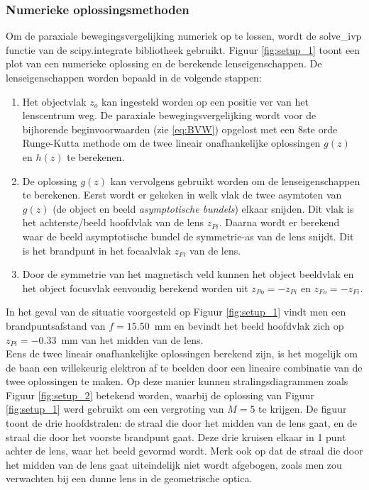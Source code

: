 \documentclass[we,twoside,openright,a4paper,11pt]{uantwerpenbamathesis}
\begin{document}
\subsubsection{Numerieke oplossingsmethoden}
Om de paraxiale bewegingsvergelijking numeriek op te lossen, wordt de solve\_ivp functie van de scipy.integrate bibliotheek gebruikt. Figuur \ref{fig:setup_1} toont een plot van een numerieke oplossing en de berekende lenseigenschappen. De lenseigenschappen worden bepaald in de volgende stappen:
\begin{enumerate}
    \item Het objectvlak $z_o$ kan ingesteld worden op een positie ver van het lenscentrum weg. De paraxiale bewegingsvergelijking wordt voor de bijhorende beginvoorwaarden (zie \ref{eq:BVW}) opgelost met een 8ste orde Runge-Kutta methode om de twee lineair onafhankelijke oplossingen $g(z)$ en $h(z)$ te berekenen.
    \item De oplossing $g(z)$ kan vervolgens gebruikt worden om de lenseigenschappen te berekenen. Eerst wordt er gekeken in welk vlak de twee asymtoten van $g(z)$ (de object en beeld \textit{asymptotische bundels}) elkaar snijden. Dit vlak is het achterste/beeld hoofdvlak van de lens $z_{Pi}$. Daarna wordt er berekend waar de beeld asymptotische bundel de symmetrie-as van de lens snijdt. Dit is het brandpunt in het focaalvlak $z_{Fi}$ van de lens.
    \item Door de symmetrie van het magnetisch veld kunnen het object beeldvlak en het object focusvlak eenvoudig berekend worden uit $z_{Po}=-z_{Pi}$ en $z_{Fo}=-z_{Fi}$.
\end{enumerate}
In het geval van de situatie voorgesteld op Figuur \ref{fig:setup_1} vindt men een brandpuntsafstand van $f=15.50$~mm en bevindt het beeld hoofdvlak zich op $z_{Pi}=-0.33$~mm van het midden van de lens.\\

Eens de twee lineair onafhankelijke oplossingen berekend zijn, is het mogelijk om de baan een willekeurig elektron af te beelden door een lineaire combinatie van de twee oplossingen te maken. Op deze manier kunnen stralingsdiagrammen zoals Figuur \ref{fig:setup_2} betekend worden, waarbij de oplossing van Figuur \ref{fig:setup_1} werd gebruikt om een vergroting van $M=5$ te krijgen. De figuur toont de drie hoofdstralen: de straal die door het midden van de lens gaat, en de straal die door het voorste brandpunt gaat. Deze drie kruisen elkaar in 1 punt achter de lens, waar het beeld gevormd wordt. Merk ook op dat de straal die door het midden van de lens gaat uiteindelijk niet wordt afgebogen, zoals men zou verwachten bij een dunne lens in de geometrische optica.
\end{document}
